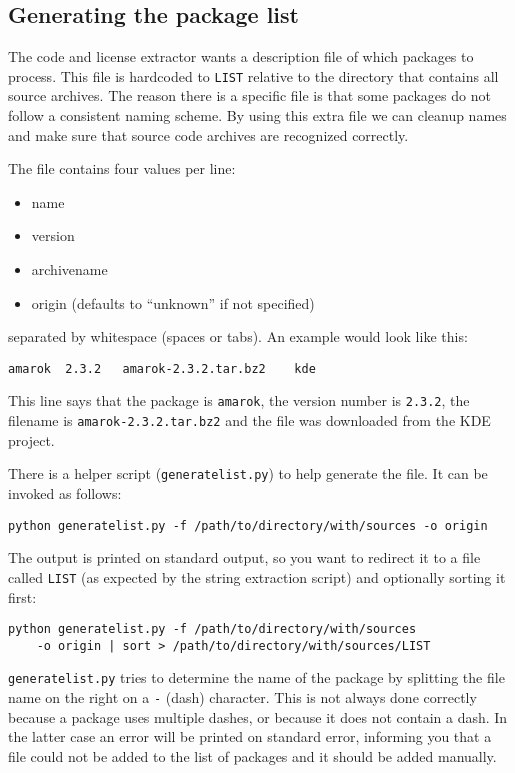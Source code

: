 \documentclass[10pt,a4paper]{article}
\begin{document}
\subsection{Generating the package list}

The code and license extractor wants a description file of which packages to
process. This file is hardcoded to \texttt{LIST} relative to the directory that
contains all source archives. The reason there is a specific file is that some
packages do not follow a consistent naming scheme. By using this extra file we
can cleanup names and make sure that source code archives are recognized
correctly.

The file contains four values per line:

\begin{itemize}
\item name
\item version
\item archivename
\item origin (defaults to ``unknown'' if not specified)
\end{itemize}

separated by whitespace (spaces or tabs). An example would look like this:

\begin{verbatim}
amarok	2.3.2	amarok-2.3.2.tar.bz2	kde
\end{verbatim}

This line says that the package is \texttt{amarok}, the version number is
\texttt{2.3.2}, the filename is \texttt{amarok-2.3.2.tar.bz2} and the file
was downloaded from the KDE project.

There is a helper script (\texttt{generatelist.py}) to help generate the file.
It can be invoked as follows:

\begin{verbatim}
python generatelist.py -f /path/to/directory/with/sources -o origin
\end{verbatim}

The output is printed on standard output, so you want to redirect it to a file
called \texttt{LIST} (as expected by the string extraction script) and
optionally sorting it first:

\begin{verbatim}
python generatelist.py -f /path/to/directory/with/sources
    -o origin | sort > /path/to/directory/with/sources/LIST
\end{verbatim}

\texttt{generatelist.py} tries to determine the name of the package by
splitting the file name on the right on a \texttt{-} (dash)
character. This is not always done correctly because a package uses multiple
dashes, or because it does not contain a dash. In the latter case an error
will be printed on standard error, informing you that a file could not be
added to the list of packages and it should be added manually.
\end{document}
